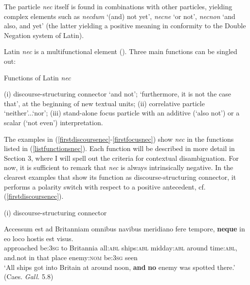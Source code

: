 \documentclass[output=paper,modfonts,nonflat,citecolor=brown,
showindex
]{langsci/langscibook}
\begin{document}
\noindent The particle {\emph{nec}} itself is found in combinations with other particles, yielding complex elements such as {\emph{necdum}} `(and) not yet', {\emph{necne}} `or not', {\emph{necnon}} `and also, and yet' (the latter yielding a positive meaning in conformity to the Double Negation system of Latin).

Latin {\emph{nec}} is a multifunctional element (\citealt[]{Orlandini01, OrlandiniPoccetti07}). Three main functions can be singled out: 

{\begin{exe}
\ex \label{listfunctionsnec} Functions of Latin {\emph{nec}}
\begin{xlist}
\ex (i) discourse-structuring connector `and not'; `furthermore, it is not the case that', at the beginning of new textual units;
\ex (ii) correlative particle `neither'...`nor';
\ex (iii) stand-alone focus particle with an additive (`also not') or a scalar (`not even') interpretation. 
\end{xlist}
\end{exe}}

\noindent The examples in (\ref{firstdiscoursenec}-\ref{firstfocusnec}) show {\emph{nec}} in the functions listed in (\ref{listfunctionsnec}). Each function will be described in more detail in Section 3, where I will spell out the criteria for contextual disambiguation. For now, it is sufficient to remark that {\emph{nec}} is always intrinsically negative. In the clearest examples that show its function as discourse-structuring connector, it performs a polarity switch with respect to a positive antecedent, cf. (\ref{firstdiscoursenec}).

{\begin{exe}
\ex (i) discourse-structuring connector 

\label{firstdiscoursenec} \gll Accessum est ad Britanniam omnibus navibus meridiano fere tempore, {\textbf{neque}} in eo loco hostis est visus.\\
approached be:{\textsc{3sg}} to Britannia all:{\textsc{abl}} ships:{\textsc{abl}} midday:{\textsc{abl}} around time:{\textsc{abl}}, and.not in that place enemy:{\textsc{nom}} be:{\textsc{3sg}} seen\\

`All ships got into Britain at around noon, {\textbf{and}} {\textbf{no}} enemy was spotted there.' (Caes.{\emph{ Gall.}} 5.8)

\end{exe}}
\end{document}

